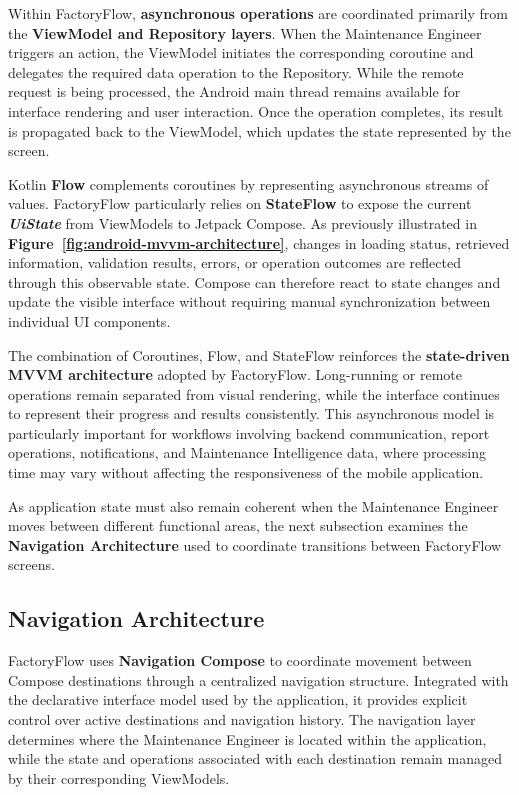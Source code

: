 Within FactoryFlow, \textbf{asynchronous operations} are coordinated primarily from the \textbf{ViewModel and Repository layers}. When the Maintenance Engineer triggers an action, the ViewModel initiates the corresponding coroutine and delegates the required data operation to the Repository. While the remote request is being processed, the Android main thread remains available for interface rendering and user interaction. Once the operation completes, its result is propagated back to the ViewModel, which updates the state represented by the screen.

Kotlin \textbf{Flow} complements coroutines by representing asynchronous streams of values. FactoryFlow particularly relies on \textbf{StateFlow} to expose the current \textbf{\textit{UiState}} from ViewModels to Jetpack Compose. As previously illustrated in \textbf{Figure~\ref{fig:android-mvvm-architecture}}, changes in loading status, retrieved information, validation results, errors, or operation outcomes are reflected through this observable state. Compose can therefore react to state changes and update the visible interface without requiring manual synchronization between individual UI components.

The combination of Coroutines, Flow, and StateFlow reinforces the \textbf{state-driven MVVM architecture} adopted by FactoryFlow. Long-running or remote operations remain separated from visual rendering, while the interface continues to represent their progress and results consistently. This asynchronous model is particularly important for workflows involving backend communication, report operations, notifications, and Maintenance Intelligence data, where processing time may vary without affecting the responsiveness of the mobile application.

As application state must also remain coherent when the Maintenance Engineer moves between different functional areas, the next subsection examines the \textbf{Navigation Architecture} used to coordinate transitions between FactoryFlow screens.


\subsection{Navigation Architecture}
\label{subsec:android-navigation-architecture}

FactoryFlow uses \textbf{Navigation Compose} to coordinate movement between Compose destinations through a centralized navigation structure. Integrated with the declarative interface model used by the application, it provides explicit control over active destinations and navigation history. The navigation layer determines where the Maintenance Engineer is located within the application, while the state and operations associated with each destination remain managed by their corresponding ViewModels.

